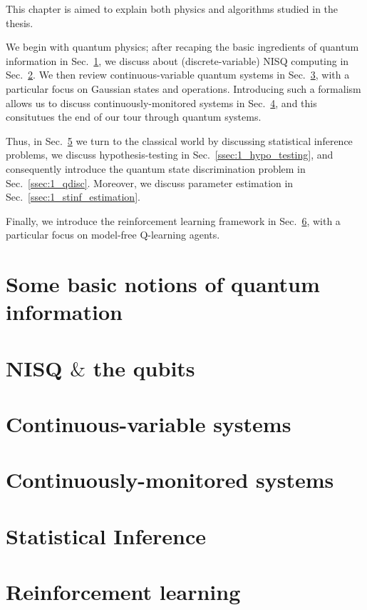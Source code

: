 This chapter is aimed to explain both physics and algorithms studied in the thesis.

We begin with quantum physics; after recaping the basic ingredients of quantum information in Sec.~\ref{sec:1_introquantum}, we discuss about (discrete-variable) NISQ computing in Sec.~\ref{sec:1_nisq}. We then review continuous-variable quantum systems in Sec.~\ref{sec:1_cv}, with a particular focus on Gaussian states and operations. Introducing such a formalism allows us to discuss continuously-monitored systems in Sec.~\ref{sec:1_cmon}, and this consitutues the end of our tour through quantum systems.

Thus, in Sec.~\ref{sec:1_statinf} we turn to the classical world by discussing statistical inference problems, we discuss hypothesis-testing in Sec.~\ref{ssec:1_hypo_testing}, and consequently introduce the quantum state discrimination problem in Sec.~\ref{ssec:1_qdisc}. Moreover, we discuss parameter estimation in Sec.~\ref{ssec:1_stinf_estimation}.

Finally, we introduce the reinforcement learning framework in Sec.~\ref{sec:1_rl}, with a particular focus on model-free Q-learning agents.

\section{Some basic notions of quantum information}
\label{sec:1_introquantum}
\section{NISQ $\&$ the qubits}\label{sec:1_nisq}

\section{Continuous-variable systems}\label{sec:1_cv}

\section{Continuously-monitored systems}\label{sec:1_cmon}

\section{Statistical Inference}\label{sec:1_statinf}

\section{Reinforcement learning}\label{sec:1_rl}

